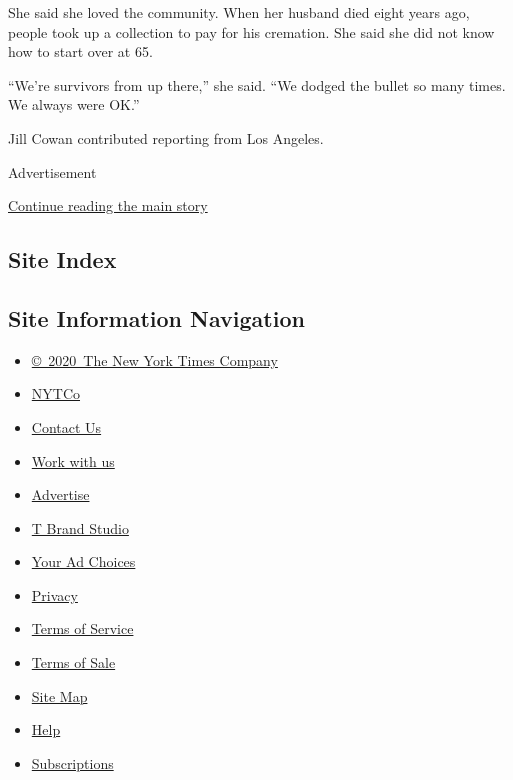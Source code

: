 She said she loved the community. When her husband died eight years ago,
people took up a collection to pay for his cremation. She said she did
not know how to start over at 65.

``We're survivors from up there,'' she said. ``We dodged the bullet so
many times. We always were OK.''

Jill Cowan contributed reporting from Los Angeles.

Advertisement

\protect\hyperlink{after-bottom}{Continue reading the main story}

\hypertarget{site-index}{%
\subsection{Site Index}\label{site-index}}

\hypertarget{site-information-navigation}{%
\subsection{Site Information
Navigation}\label{site-information-navigation}}

\begin{itemize}
\tightlist
\item
  \href{https://help.nytimes3xbfgragh.onion/hc/en-us/articles/115014792127-Copyright-notice}{©~2020~The
  New York Times Company}
\end{itemize}

\begin{itemize}
\tightlist
\item
  \href{https://www.nytco.com/}{NYTCo}
\item
  \href{https://help.nytimes3xbfgragh.onion/hc/en-us/articles/115015385887-Contact-Us}{Contact
  Us}
\item
  \href{https://www.nytco.com/careers/}{Work with us}
\item
  \href{https://nytmediakit.com/}{Advertise}
\item
  \href{http://www.tbrandstudio.com/}{T Brand Studio}
\item
  \href{https://www.nytimes3xbfgragh.onion/privacy/cookie-policy\#how-do-i-manage-trackers}{Your
  Ad Choices}
\item
  \href{https://www.nytimes3xbfgragh.onion/privacy}{Privacy}
\item
  \href{https://help.nytimes3xbfgragh.onion/hc/en-us/articles/115014893428-Terms-of-service}{Terms
  of Service}
\item
  \href{https://help.nytimes3xbfgragh.onion/hc/en-us/articles/115014893968-Terms-of-sale}{Terms
  of Sale}
\item
  \href{https://spiderbites.nytimes3xbfgragh.onion}{Site Map}
\item
  \href{https://help.nytimes3xbfgragh.onion/hc/en-us}{Help}
\item
  \href{https://www.nytimes3xbfgragh.onion/subscription?campaignId=37WXW}{Subscriptions}
\end{itemize}
